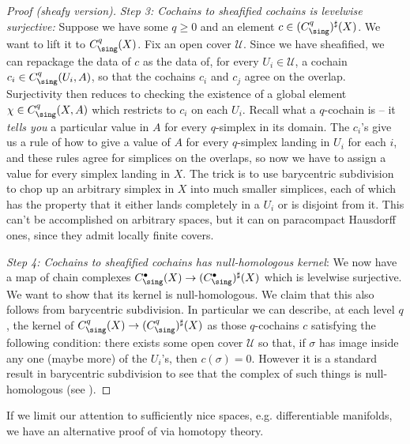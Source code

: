 \documentclass[11pt]{amsart}
\begin{document}
\begin{proof}[Proof (sheafy version)]
\emph{Step 3: Cochains to sheafified cochains is levelwise surjective:} Suppose we have some $q\ge 0$ and an element $c\in (C^q_\sing)^\sharp(X)$. We want to lift it to $C^q_\sing(X)$. Fix an open cover $\mathcal{U}$. Since we have sheafified, we can repackage the data of $c$ as the data of, for every $U_i \in \mathcal{U}$, a cochain $c_i \in C^q_\sing(U_i,A)$, so that the cochains $c_i$ and $c_j$ agree on the overlap. Surjectivity then reduces to checking the existence of a global element $\chi \in C^q_\sing(X,A)$ which restricts to $c_i$ on each $U_i$. Recall what a $q$-cochain is -- it \emph{tells you} a particular value in $A$ for every $q$-simplex in its domain. The $c_i$'s give us a rule of how to give a value of $A$ for every $q$-simplex landing in $U_i$ for each $i$, and these rules agree for simplices on the overlaps, so now we have to assign a value for every simplex landing in $X$. The trick is to use barycentric subdivision to chop up an arbitrary simplex in $X$ into much smaller simplices, each of which has the property that it either lands completely in a $U_i$ or is disjoint from it. This can't be accomplished on arbitrary spaces, but it can on paracompact Hausdorff ones, since they admit locally finite covers.

\emph{Step 4: Cochains to sheafified cochains has null-homologous kernel}: We now have a map of chain complexes $C^\bullet_\sing(X) \to (C_\sing^\bullet)^\sharp(X)$ which is levelwise surjective. We want to show that its kernel is null-homologous. We claim that this also follows from barycentric subdivision. In particular we can describe, at each level $q$, the kernel of $C^q_\sing(X) \to (C^q_\sing)^\sharp(X)$ as those $q$-cochains $c$ satisfying the following condition: there exists some open cover $\mathcal{U}$ so that, if $\sigma$ has image inside any one (maybe more) of the $U_i$'s, then $c(\sigma) = 0$. However it is a standard result in barycentric subdivision to see that the complex of such things is null-homologous (see \cite[2.21]{Hatcher}).
\end{proof}

If we limit our attention to sufficiently nice spaces, e.g. differentiable manifolds, we have an alternative proof of  via homotopy theory.
\end{document}
